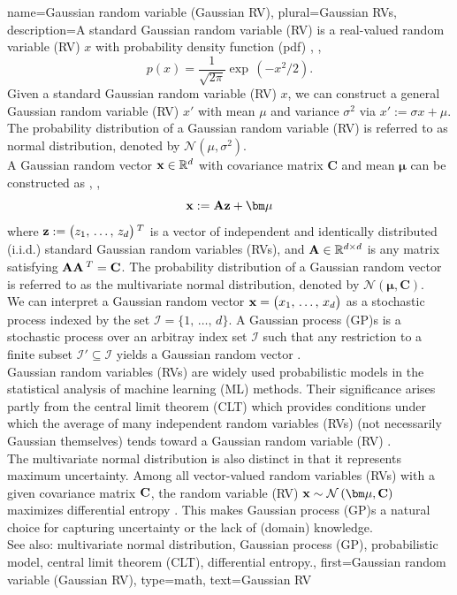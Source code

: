 {
{name={Gaussian random variable (Gaussian RV)}, 
	plural={Gaussian RVs}, 
	description={A  standard Gaussian random variable (RV) is a 
		real-valued random variable (RV) $x$ with probability density function (pdf) \cite{BertsekasProb}, \cite{GrayProbBook}, \cite{papoulis}
		\begin{equation}
			\nonumber
			p(x) = \frac{1}{\sqrt{2\pi}} \exp\,(-x^2/2). 
		\end{equation}
		Given a standard Gaussian random variable (RV) $x$, we can construct a general Gaussian 
		random variable (RV) $x'$ with mean $\mu$ and variance $\sigma^2$ via $x' := \sigma x + \mu$. 
		The probability distribution of a Gaussian random variable (RV) is referred to as normal 
		distribution, denoted by $\mathcal{N}\left(\mu,\sigma^{2}\right)$. 
		\\ 
		A Gaussian random vector ${\bf x} \in \mathbb{R}^{d}$ with 
		covariance matrix $\mathbf{C}$ and mean ${\bm \mu}$ can be constructed as \cite{GrayProbBook}, \cite{papoulis}, \cite{Lapidoth09}
		\[
		{\bf x} := \mathbf{A} {\bf z} + {\bm \mu}
		\]
		where ${\bf z} := \big( z_{1}, \,\ldots, \,z_{d} \big)\,^{T}$ is a vector 
		of independent and identically distributed (i.i.d.) standard Gaussian random variables (RVs), and ${\bf A} \in \mathbb{R}^{d \times d}$ is any matrix satisfying ${\bf A} {\bf A}\,^{T} = {\bf C}$. 
		The probability distribution of a Gaussian random vector is referred to as the multivariate normal distribution, 
		denoted by $\mathcal{N}\left(\bm \mu,\mathbf{C}\right)$.
		\\
		We can interpret a Gaussian random vector ${\bf x}=\big(x_{1},\,\ldots,\,x_{d}\big)$ as a stochastic process 
		indexed by the set $\mathcal{I}=\{1,\,\ldots,\,d\}$. A Gaussian process (GP)s is a 
		stochastic process over an arbitray index set $\mathcal{I}$ such that any restriction 
		to a finite subset $\mathcal{I}' \subseteq \mathcal{I}$ yields a Gaussian 
		random vector \cite{Rasmussen2006Gaussian}.
  		\\
        		Gaussian random variables (RVs) are widely used probabilistic models in the 
				statistical analysis of machine learning (ML) methods. Their significance arises 
				partly from the central limit theorem (CLT) which provides conditions under which 
				the average of many independent random variables (RVs) (not necessarily Gaussian themselves) 
				tends toward a Gaussian random variable (RV) \cite{ross2013first}.
		\\ 
		The multivariate normal distribution is also distinct in that it represents maximum uncertainty. 
		Among all vector-valued random variables (RVs) with a given covariance matrix ${\bf C}$, the 
		random variable (RV) ${\bf x} \sim \mathcal{N}\left(\bm \mu,\mathbf{C}\right)$ maximizes differential entropy 
		\cite[Th. 8.6.5]{coverthomas}. This makes Gaussian process (GP)s a natural choice for 
		capturing uncertainty or the lack of (domain) knowledge.
		\\ 
		See also: multivariate normal distribution, Gaussian process (GP), probabilistic model, central limit theorem (CLT), differential entropy.},
	first={Gaussian random variable (Gaussian RV)},
	type=math, 
	text={Gaussian RV}
}

}
